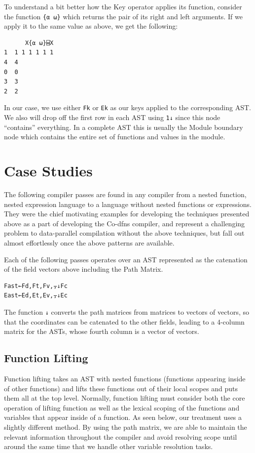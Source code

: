 ﻿\documentclass[numbers,10pt,preprint]{sigplanconf}
\begin{document}
\noindent To understand a bit better how the Key operator applies its function, consider the function \verb;{⍺ ⍵}; which returns the pair of its right and left arguments. If we apply it to the same value as above, we get the following:

\begin{verbatim}
      X{⍺ ⍵}⌸X
1  1 1 1 1 1 1 
4  4           
0  0           
3  3           
2  2
\end{verbatim}

\noindent In our case, we use either \verb;Fk; or \verb;Ek; as our keys applied to the corresponding AST. We also will drop off the first row in each AST using \verb;1↓; since this node ``contains'' everything. In a complete AST this is usually the Module boundary node which contains the entire set of functions and values in the module.

\section{Case Studies}

The following compiler passes are found in any compiler from a nested function, nested expression language to a language without nested functions or expressions. They were the chief motivating examples for developing the techniques presented above as a part of developing the Co-dfns compiler, and represent a challenging problem to data-parallel compilation without the above techniques, but fall out almost effortlessly once the above patterns are available.

Each of the following passes operates over an AST represented as the catenation of the field vectors above including the Path Matrix.

\begin{verbatim}
Fast←Fd,Ft,Fv,⍪↓Fc
East←Ed,Et,Ev,⍪↓Ec
\end{verbatim}

\noindent The function \verb;↓; converts the path matrices from matrices to vectors of vectors, so that the coordinates can be catenated to the other fields, leading to a 4-column matrix for the ASTs, whose fourth column is a vector of vectors. 

\subsection{Function Lifting}

Function lifting takes an AST with nested functions (functions appearing inside of other functions) and lifts these functions out of their local scopes and puts them all at the top level. Normally, function lifting must consider both the core operation of lifting function as well as the lexical scoping of the functions and variables that appear inside of a function. As seen below, our treatment uses a slightly different method. By using the path matrix, we are able to maintain the relevant information throughout the compiler and avoid resolving scope until around the same time that we handle other variable resolution tasks.
\end{document}
